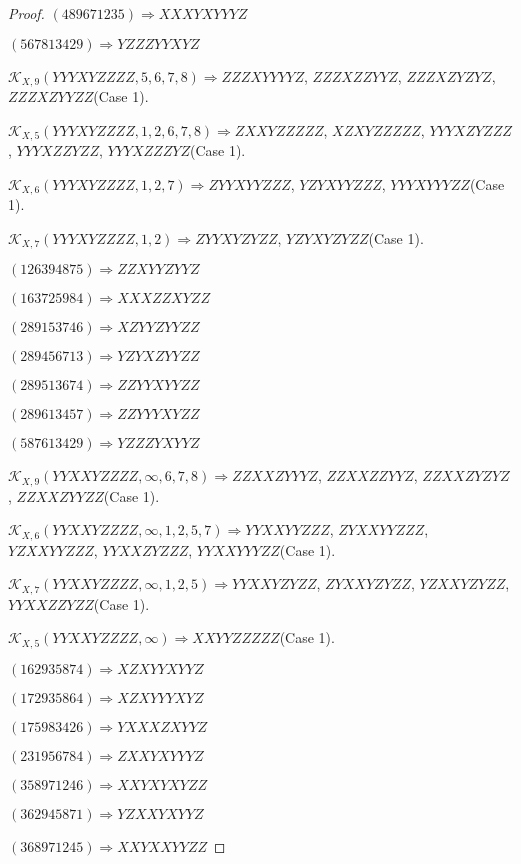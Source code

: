 \documentclass[12pt]{article}
\theoremstyle{plain}
\theoremstyle{definition}
\theoremstyle{remark}
\newcommand{\fancy}[1]{\mathcal{#1}}
\def\K{\fancy{K}}
\begin{document}
\begin{proof}
	$(4 8 9 6 7 1 2 3 5)\Rightarrow XXXYXYYYZ$
	
	$(5 6 7 8 1 3 4 2 9)\Rightarrow YZZZYYXYZ$
	
	
	
	$\K_{X,9}(YYYXYZZZZ,5, 6, 7, 8)\Rightarrow $$ZZZXYYYYZ$, $ZZZXZZYYZ$, $ZZZXZYZYZ$, $ZZZXZYYZZ$(Case 1).
	
	$\K_{X,5}(YYYXYZZZZ,1, 2, 6, 7, 8)\Rightarrow $$ZXXYZZZZZ$, $XZXYZZZZZ$, $YYYXZYZZZ$, $YYYXZZYZZ$, $YYYXZZZYZ$(Case 1).
	
	$\K_{X,6}(YYYXYZZZZ,1, 2, 7)\Rightarrow $$ZYYXYYZZZ$, $YZYXYYZZZ$, $YYYXYYYZZ$(Case 1).
	
	$\K_{X,7}(YYYXYZZZZ,1, 2)\Rightarrow $$ZYYXYZYZZ$, $YZYXYZYZZ$(Case 1).
	
	
	
	$(1 2 6 3 9 4 8 7 5)\Rightarrow ZZXYYZYYZ$
	
	$(1 6 3 7 2 5 9 8 4)\Rightarrow XXXZZXYZZ$
	
	$(2 8 9 1 5 3 7 4 6)\Rightarrow XZYYZYYZZ$
	
	$(2 8 9 4 5 6 7 1 3)\Rightarrow YZYXZYYZZ$
	
	$(2 8 9 5 1 3 6 7 4)\Rightarrow ZZYYXYYZZ$
	
	$(2 8 9 6 1 3 4 5 7)\Rightarrow ZZYYYXYZZ$
	
	$(5 8 7 6 1 3 4 2 9)\Rightarrow YZZZYXYYZ$
	
	
	
	$\K_{X,9}(YYXXYZZZZ,\infty,6, 7, 8)\Rightarrow $$ZZXXZYYYZ$, $ZZXXZZYYZ$, $ZZXXZYZYZ$, $ZZXXZYYZZ$(Case 1).
	
	$\K_{X,6}(YYXXYZZZZ,\infty,1, 2, 5, 7)\Rightarrow $$YYXXYYZZZ$, $ZYXXYYZZZ$, $YZXXYYZZZ$, $YYXXZYZZZ$, $YYXXYYYZZ$(Case 1).
	
	$\K_{X,7}(YYXXYZZZZ,\infty,1, 2, 5)\Rightarrow $$YYXXYZYZZ$, $ZYXXYZYZZ$, $YZXXYZYZZ$, $YYXXZZYZZ$(Case 1).
	
	$\K_{X,5}(YYXXYZZZZ,\infty)\Rightarrow $$XXYYZZZZZ$(Case 1).
	
	
	
	$(1 6 2 9 3 5 8 7 4)\Rightarrow XZXYYXYYZ$
	
	$(1 7 2 9 3 5 8 6 4)\Rightarrow XZXYYYXYZ$
	
	$(1 7 5 9 8 3 4 2 6)\Rightarrow YXXXZXYYZ$
	
	$(2 3 1 9 5 6 7 8 4)\Rightarrow ZXXYXYYYZ$
	
	$(3 5 8 9 7 1 2 4 6)\Rightarrow XXYXYXYZZ$
	
	$(3 6 2 9 4 5 8 7 1)\Rightarrow YZXXYXYYZ$
	
	$(3 6 8 9 7 1 2 4 5)\Rightarrow XXYXXYYZZ$
	

\end{proof}
\end{document}
